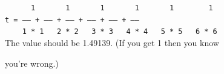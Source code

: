 
\texttt{\ \ \ \ \ \ 1\ \ \ \ \ \ \ 1\ \ \ \ \ \ \ 1\ \ \ \ \ \ \ 1\ \ \ \ \ \ \ 1\ \ \ \ \ \ \ \ 1}\\

\texttt{t = ----- + ----- + ----- + ----- + ----- + -----}\\

\texttt{\ \ \ \ 1 * 1\ \ \ 2 * 2\ \ \ 3 * 3\ \ \ 4 * 4\ \ \ 5 * 5\ \ \ 6 * 6}\\



The value should be 1.49139. (If you get 1 then you know

you're wrong.)

